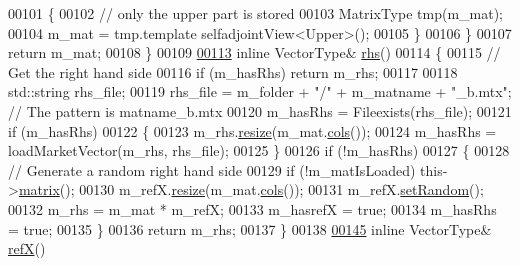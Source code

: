 \begin{DoxyCode}
00101         \{
00102           \textcolor{comment}{// only the upper part is stored}
00103           MatrixType tmp(m\_mat);
00104           m\_mat = tmp.template selfadjointView<Upper>();
00105         \}
00106       \}
00107       \textcolor{keywordflow}{return} m\_mat; 
00108     \}
00109     
\hyperlink{class_eigen_1_1_matrix_market_iterator_ac141e537f3bc3a3c078a2780a6a956b6}{00113}     \textcolor{keyword}{inline} VectorType& \hyperlink{class_eigen_1_1_matrix_market_iterator_ac141e537f3bc3a3c078a2780a6a956b6}{rhs}() 
00114     \{ 
00115        \textcolor{comment}{// Get the right hand side}
00116       \textcolor{keywordflow}{if} (m\_hasRhs) \textcolor{keywordflow}{return} m\_rhs;
00117       
00118       std::string rhs\_file;
00119       rhs\_file = m\_folder + \textcolor{stringliteral}{"/"} + m\_matname + \textcolor{stringliteral}{"\_b.mtx"}; \textcolor{comment}{// The pattern is matname\_b.mtx}
00120       m\_hasRhs = Fileexists(rhs\_file);
00121       \textcolor{keywordflow}{if} (m\_hasRhs)
00122       \{
00123         m\_rhs.\hyperlink{class_eigen_1_1_plain_object_base_a99d9054ee2d5a40c6e00ded0265e9cea}{resize}(m\_mat.\hyperlink{group___sparse_core___module_aa391750e3c530227e4a5c3c52e959975}{cols}());
00124         m\_hasRhs = loadMarketVector(m\_rhs, rhs\_file);
00125       \}
00126       \textcolor{keywordflow}{if} (!m\_hasRhs)
00127       \{
00128         \textcolor{comment}{// Generate a random right hand side}
00129         \textcolor{keywordflow}{if} (!m\_matIsLoaded) this->\hyperlink{class_eigen_1_1_matrix_market_iterator_ac938961d685306ef5b48d9943f7dcabd}{matrix}(); 
00130         m\_refX.\hyperlink{class_eigen_1_1_plain_object_base_a99d9054ee2d5a40c6e00ded0265e9cea}{resize}(m\_mat.\hyperlink{group___sparse_core___module_aa391750e3c530227e4a5c3c52e959975}{cols}());
00131         m\_refX.\hyperlink{class_eigen_1_1_plain_object_base_af0e576a0e1aefc9ee346de44cc352ba3}{setRandom}();
00132         m\_rhs = m\_mat * m\_refX;
00133         m\_hasrefX = \textcolor{keyword}{true};
00134         m\_hasRhs = \textcolor{keyword}{true};
00135       \}
00136       \textcolor{keywordflow}{return} m\_rhs; 
00137     \}
00138     
\hyperlink{class_eigen_1_1_matrix_market_iterator_a80f334d9fbbed0d24ba0c32d2bea16bc}{00145}     \textcolor{keyword}{inline} VectorType& \hyperlink{class_eigen_1_1_matrix_market_iterator_a80f334d9fbbed0d24ba0c32d2bea16bc}{refX}() 

\end{DoxyCode}

